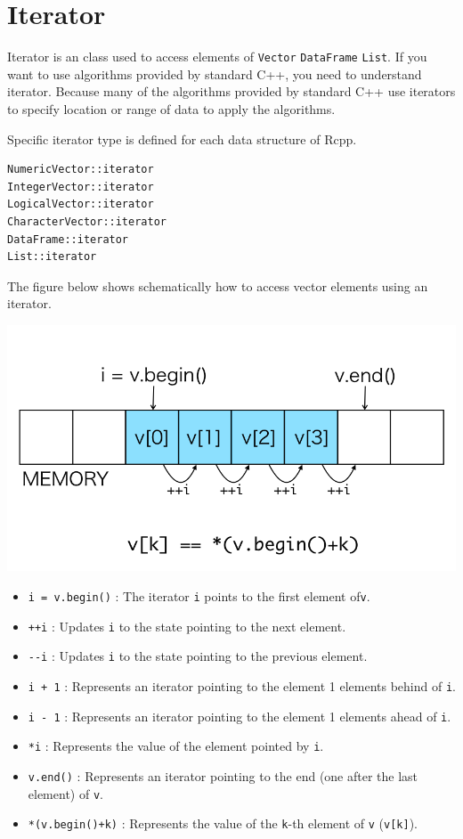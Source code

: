\documentclass[]{book}
\providecommand{\tightlist}{%
  \setlength{\itemsep}{0pt}\setlength{\parskip}{0pt}}
\begin{document}
\hypertarget{iterator}{%
\chapter{Iterator}\label{iterator}}

Iterator is an class used to access elements of \texttt{Vector} \texttt{DataFrame} \texttt{List}. If you want to use algorithms provided by standard C++, you need to understand iterator. Because many of the algorithms provided by standard C++ use iterators to specify location or range of data to apply the algorithms.

Specific iterator type is defined for each data structure of Rcpp.

\begin{verbatim}
NumericVector::iterator
IntegerVector::iterator
LogicalVector::iterator
CharacterVector::iterator
DataFrame::iterator
List::iterator
\end{verbatim}

The figure below shows schematically how to access vector elements using an iterator.

\includegraphics{iterator.png}

\begin{itemize}
\tightlist
\item
  \texttt{i\ =\ v.begin()} : The iterator \texttt{i} points to the first element of\texttt{v}.
\item
  \texttt{++i} : Updates \texttt{i} to the state pointing to the next element.
\item
  \texttt{-\/-i} : Updates \texttt{i} to the state pointing to the previous element.
\item
  \texttt{i\ +\ 1} : Represents an iterator pointing to the element 1 elements behind of \texttt{i}.
\item
  \texttt{i\ -\ 1} : Represents an iterator pointing to the element 1 elements ahead of \texttt{i}.
\item
  \texttt{*i} : Represents the value of the element pointed by \texttt{i}.
\item
  \texttt{v.end()} : Represents an iterator pointing to the end (one after the last element) of \texttt{v}.
\item
  \texttt{*(v.begin()+k)} : Represents the value of the \texttt{k}-th element of \texttt{v} (\texttt{v{[}k{]}}).
\end{itemize}
\end{document}
